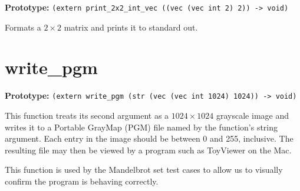 \documentclass[oneside]{report}
\begin{document}
\textbf{Prototype:} \lstinline{(extern print_2x2_int_vec ((vec (vec int 2) 2)) -> void)}

Formats a $2 \times 2$ matrix and prints it to standard out.


\section{write\_pgm}

\textbf{Prototype:} \lstinline{(extern write_pgm (str (vec (vec int 1024) 1024)) -> void)}

This function treats its second argument as a $1024 \times 1024$
grayscale image and writes it to a Portable GrayMap (PGM) file named
by the function's string argument. Each entry in the image should be
between 0 and 255, inclusive. The resulting file may then be viewed by
a program such as ToyViewer on the Mac.

This function is used by the Mandelbrot set test cases to allow us to
visually confirm the program is behaving correctly.
\end{document}
